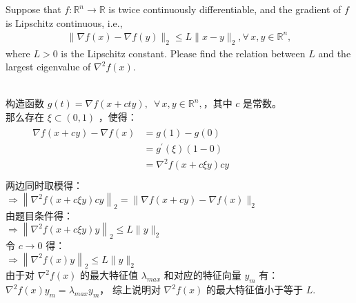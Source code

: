 \documentclass[11pt,letter,notitlepage]{article}
\begin{document}
\begin{exercise}
Suppose that $f:\mathbb{R}^n\rightarrow\mathbb{R}$ is twice continuously differentiable, and the gradient of $f$ is Lipschitz continuous, i.e.,
\begin{align*}
    \|\nabla f(x)-\nabla f(y)\|_2\le L\|x-y\|_2, \forall\,x,y\in\mathbb{R}^n,
\end{align*}
where $L>0$ is the Lipschitz constant. Please find the relation between $L$ and the largest eigenvalue of $\nabla^2 f(x)$.
\end{exercise}
\begin{solution}
    \heiti \ \\
    构造函数 $g(t)= \nabla f(x+c t y),$\  $\forall\,x,y\in\mathbb{R}^n,$，其中 $c$ 是常数。\\
    那么存在 $\xi \subset (0,1)$ ，使得：\\
    $\begin{array}{l}{\qquad \begin{aligned}  \nabla f(x+c y)-\nabla f(x) &=g(1)-g(0) \\ &=g^{\prime}\left(\xi \right)(1-0) \\ &=\nabla^{2} f(x+c\xi y)c y \end{aligned}} \\  \end{array}$\\
    两边同时取模得：\\
    $ \Rightarrow \left\|\nabla^{2} f(x+c \xi y) c y\right\|_2 =\|\nabla f(x+c y)-\nabla f(x)\|_2$\\
    由题目条件得：\\
    ${\Rightarrow\left\|\nabla^{2} f(x+c \xi y) y\right\|_2 \leqslant L\|y\|_2}$\\
    令 ${c \rightarrow 0}$ 得：\\
    ${\Rightarrow\left\|\nabla^{2} f(x) y\right\|_2 \leqslant L\|y\|_2}$\\
    由于对 $\nabla^{2}f(x) $ 的最大特征值 $\lambda_{max}$ 和对应的特征向量 $y_m$ 有：$ \nabla^{2}f(x)y_m = \lambda_{max} y_m$，
    综上说明对 $\nabla^{2}f(x)$ 的最大特征值小于等于 $L$.
\end{solution}
\newpage
\end{document}
